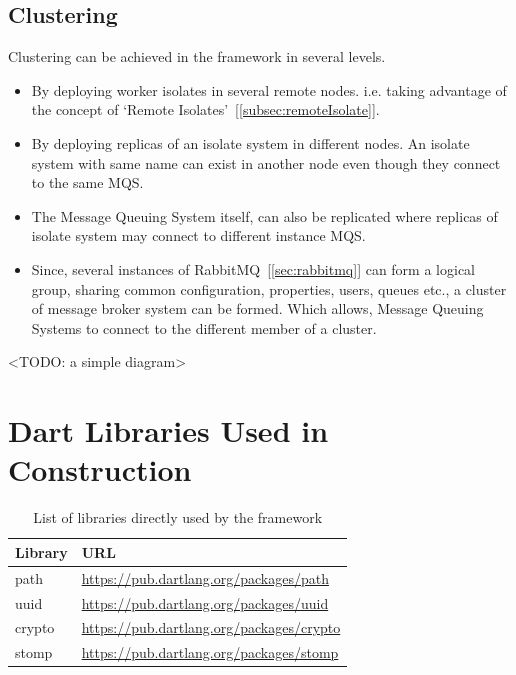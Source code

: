 \subsection{Clustering}
  Clustering can be achieved in the framework in several levels.
  \begin{itemize}
  \item By deploying worker isolates in several remote nodes. i.e. taking advantage of the concept of ‘Remote Isolates’~[\autoref{subsec:remoteIsolate}].
  \item By deploying replicas of an isolate system in different nodes. An isolate system with same name can exist in another node even though they connect to the same MQS.
  \item The Message Queuing System itself, can also be replicated where replicas of isolate system may connect to different instance MQS.
  \item Since, several instances of RabbitMQ~[\autoref{sec:rabbitmq}] can form a logical group, sharing common configuration, properties, users, queues etc., a cluster of message broker system can be formed. Which allows, Message Queuing Systems to connect to the different member of a cluster.
  \end{itemize}
<TODO: a simple diagram>
\section{Dart Libraries Used in Construction}
\begin{table}[htsb]
  \caption[Dependent libraries of the framework]{List of libraries directly used by the framework}\label{tab:libraries}
  \centering
  \begin{tabular}{l l}
    \toprule
      Library & URL \\
    \midrule
      path &  \url{https://pub.dartlang.org/packages/path}\\
      uuid &  \url{https://pub.dartlang.org/packages/uuid}\\
      crypto &  \url{https://pub.dartlang.org/packages/crypto}\\
      stomp &  \url{https://pub.dartlang.org/packages/stomp}\\
    \bottomrule
  \end{tabular}
\end{table}

